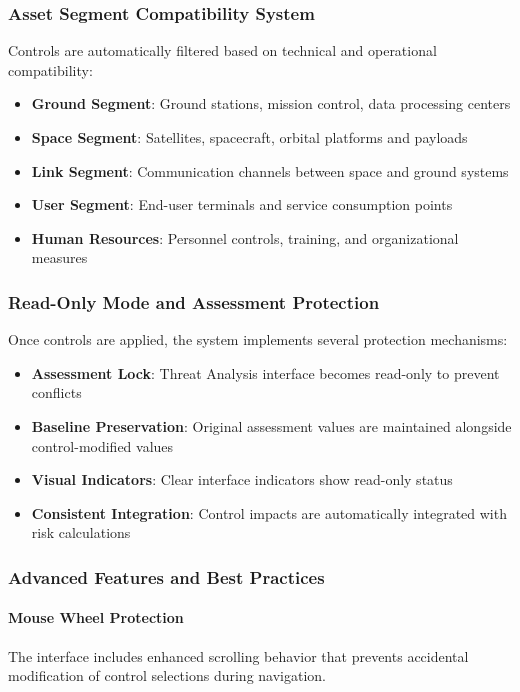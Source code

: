 \documentclass[binding=0.6cm]{sapthesis}
\begin{document}
\subsubsection{Asset Segment Compatibility System}

Controls are automatically filtered based on technical and operational compatibility:

\begin{itemize}
    \item \textbf{Ground Segment}: Ground stations, mission control, data processing centers
    \item \textbf{Space Segment}: Satellites, spacecraft, orbital platforms and payloads
    \item \textbf{Link Segment}: Communication channels between space and ground systems
    \item \textbf{User Segment}: End-user terminals and service consumption points
    \item \textbf{Human Resources}: Personnel controls, training, and organizational measures
\end{itemize}

\subsubsection{Read-Only Mode and Assessment Protection}

Once controls are applied, the system implements several protection mechanisms:

\begin{itemize}
    \item \textbf{Assessment Lock}: Threat Analysis interface becomes read-only to prevent conflicts
    \item \textbf{Baseline Preservation}: Original assessment values are maintained alongside control-modified values
    \item \textbf{Visual Indicators}: Clear interface indicators show read-only status
    \item \textbf{Consistent Integration}: Control impacts are automatically integrated with risk calculations
\end{itemize}

\subsubsection{Advanced Features and Best Practices}

\paragraph{Mouse Wheel Protection}
The interface includes enhanced scrolling behavior that prevents accidental modification of control selections during navigation.
\end{document}
